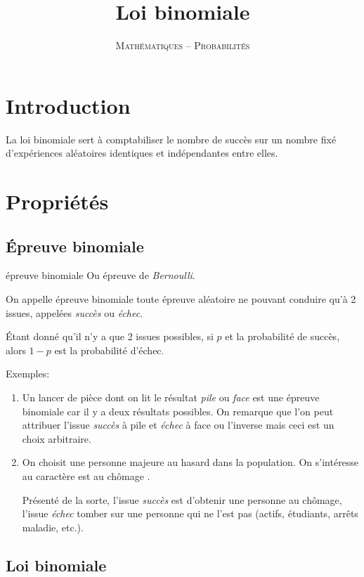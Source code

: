 \documentclass[a4paper,12pt]{scrartcl}
\date{}
\title{Loi binomiale}
\author{\textsc{Mathématiques -- Probabilités}}
\begin{document}
\maketitle

\tableofcontents

\section*{Introduction}

La loi binomiale sert à comptabiliser le nombre de succès sur un nombre fixé d'expériences aléatoires identiques et indépendantes entre elles.

\section{Propriétés}

\subsection{Épreuve binomiale}

\begin{definition}{épreuve binomiale}
Ou épreuve de \emph{Bernoulli}.

 On appelle épreuve binomiale toute épreuve aléatoire ne pouvant conduire qu'à 2 issues, appelées \emph{succès} ou \emph{échec}.
 
 Étant donné qu'il n'y a que 2 issues possibles, si $p$ et la probabilité de succès, alors $1-p$ est la probabilité d'échec.
\end{definition}

Exemples:

\begin{enumerate}
 \item Un lancer de pièce dont on lit le résultat \emph{pile} ou \emph{face} est une épreuve binomiale car il y a deux résultats possibles. On remarque que l'on peut attribuer l'issue \emph{succès} à pile et \emph{échec} à face ou l'inverse mais ceci est un choix arbitraire.
 \item On choisit une personne majeure au hasard dans la population. On s'intéresse au caractère \og{}est au chômage \fg{}. 
 
 Présenté de la sorte, l'issue \emph{succès} est d'obtenir une personne au chômage, l'issue \emph{échec} tomber sur une personne qui ne l'est pas (actifs, étudiants, arrêts maladie, etc.).
\end{enumerate}

\subsection{Loi binomiale}
\end{document}

